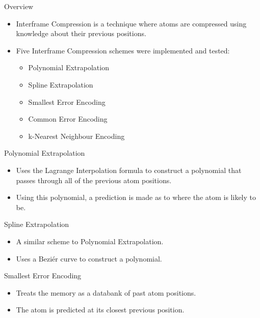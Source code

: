 \documentclass{beamer}
\begin{document}
\begin{frame}{Overview}
\begin{itemize}
 \item Interframe Compression is a technique where atoms are compressed using
   knowledge about their previous positions.

 \item Five Interframe Compression schemes were implemented and tested:
 \begin{itemize}
   \item Polynomial Extrapolation
   \item Spline Extrapolation
   \item Smallest Error Encoding
   \item Common Error Encoding
   \item k-Nearest Neighbour Encoding
 \end{itemize}
\end{itemize}
\end{frame}

\begin{frame}{Polynomial Extrapolation}
\begin{itemize}
 \item Uses the Lagrange Interpolation formula to construct a polynomial that
   passes through all of the previous atom positions.

 \item Using this polynomial, a prediction is made as to where the atom is
   likely to be.
\end{itemize}
\end{frame}

\begin{frame}{Spline Extrapolation}
\begin{itemize}
 \item A similar scheme to Polynomial Extrapolation.

 \item Uses a Bezi\'er curve to construct a polynomial.
\end{itemize}
\end{frame}

\begin{frame}{Smallest Error Encoding}
\begin{itemize}
 \item Treats the memory as a databank of past atom positions.

 \item The atom is predicted at its closest previous position.
\end{itemize}
\end{frame}
\end{document}
